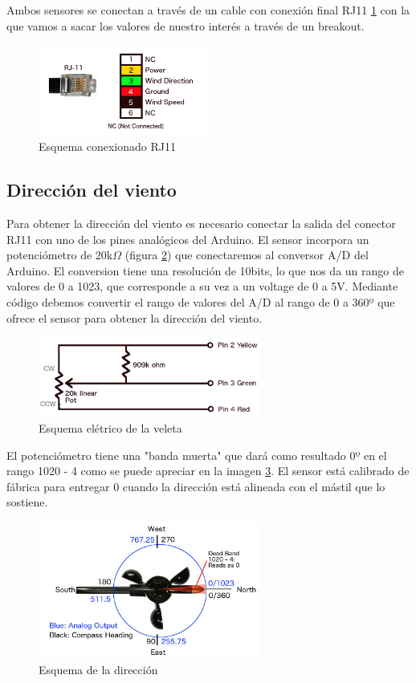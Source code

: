 \documentclass[a4paper, 11pt]{article}
\begin{document}
Ambos sensores se conectan a través de un cable con conexión final RJ11 \ref{fig:rj11} con la que vamos a sacar los valores de nuestro interés a través de un breakout. 

\begin{figure}[h]
	\center
	\includegraphics[width=0.5\textwidth]{img/rj11.png}
	\caption{Esquema conexionado RJ11}
	\label{fig:rj11}
\end{figure}

\subsection{Dirección del viento}
Para obtener la dirección del viento es necesario conectar la salida del conector RJ11 con uno de los pines analógicos del Arduino. El sensor incorpora un potenciómetro de 20k$\Omega$ (figura \ref{fig:schema}) que conectaremos al conversor A/D del Arduino. El conversion tiene una resolución de 10bits, lo que nos da un rango de valores de 0 a 1023, que corresponde a su vez a un voltage de 0 a 5V. Mediante código debemos convertir el rango de valores del A/D al rango de 0 a 360º que ofrece el sensor para obtener la dirección del viento.

\begin{figure}[h]
	\center
	\includegraphics[width=0.65\textwidth]{img/schema.png}
	\caption{Esquema elétrico de la veleta}
	\label{fig:schema}
\end{figure}

El potenciómetro tiene una "banda muerta" que dará como resultado 0º en el rango 1020 - 4 como se puede apreciar en la imagen \ref{fig:direction}. El sensor está calibrado de fábrica para entregar 0 cuando la dirección está alineada con el mástil que lo sostiene.

\begin{figure}[h]
	\center
	\includegraphics[width=0.65\textwidth]{img/direction.jpg}
	\caption{Esquema de la dirección}
	\label{fig:direction}
\end{figure}
\end{document}
